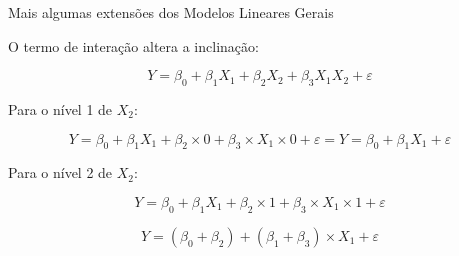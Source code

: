 \documentclass{beamer}\usepackage[]{graphicx}\usepackage[]{color}
\begin{document}


\begin{frame}{Mais algumas extensões dos Modelos Lineares Gerais}

\begin{small}

O termo de interação altera a inclinação:

\begin{equation*}
Y = \beta _0 + \beta _1 X_1 + \beta _2 X_2 + \beta _3 X_1 X_2 + \varepsilon
\end{equation*}

Para o nível 1 de $X_2$:

\begin{equation*}
Y = \beta _0  + \beta _1 X_1 + \beta _2 \times 0 + \beta _3 \times X_1 \times 0 + \varepsilon = Y = \beta _0 + \beta _1 X_1 + \varepsilon
\end{equation*}

Para o nível 2 de $X_2$:

\begin{equation*}
Y = \beta _0  + \beta _1 X_1 + \beta _2 \times 1 + \beta _3 \times X_1 \times 1 + \varepsilon
\end{equation*}

\begin{equation*}
Y = (\beta _0 +  \beta _2) + (\beta _1 + \beta _3) \times  X_1 + \varepsilon
\end{equation*}

\end{small}

\end{frame}
\end{document}

